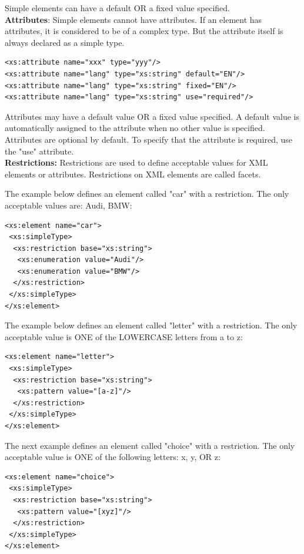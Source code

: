\documentclass[11pt,oneside,a4paper]{article}
\begin{document}
Simple elements can have a default OR a fixed value specified.\\

\textbf{Attributes}: Simple elements cannot have attributes. If an element has attributes, it is considered to be of a complex type. But the attribute itself is always declared as a simple type.

\lstset{language=XML}
\begin{lstlisting}
<xs:attribute name="xxx" type="yyy"/> 
<xs:attribute name="lang" type="xs:string" default="EN"/> 
<xs:attribute name="lang" type="xs:string" fixed="EN"/> 
<xs:attribute name="lang" type="xs:string" use="required"/> 
\end{lstlisting}
Attributes may have a default value OR a fixed value specified. A default value is automatically assigned to the attribute when no other value is specified. Attributes are optional by default. To specify that the attribute is required, use the "use" attribute.\\

\textbf{Restrictions:} Restrictions are used to define acceptable values for XML elements or attributes. Restrictions on XML elements are called facets.

The example below defines an element called "car" with a restriction. The only acceptable values are: Audi, BMW:
\lstset{language=XML}
\begin{lstlisting}
<xs:element name="car">
 <xs:simpleType>
  <xs:restriction base="xs:string">
   <xs:enumeration value="Audi"/>
   <xs:enumeration value="BMW"/>
  </xs:restriction>
 </xs:simpleType>
</xs:element>
\end{lstlisting}

The example below defines an element called "letter" with a restriction. The only acceptable value is ONE of the LOWERCASE letters from a to z:
\lstset{language=XML}
\begin{lstlisting}
<xs:element name="letter">
 <xs:simpleType>
  <xs:restriction base="xs:string">
   <xs:pattern value="[a-z]"/>
  </xs:restriction>
 </xs:simpleType>
</xs:element>
\end{lstlisting}

The next example defines an element called "choice" with a restriction. The only acceptable value is ONE of the following letters: x, y, OR z:
\lstset{language=XML}
\begin{lstlisting}
<xs:element name="choice">
 <xs:simpleType>
  <xs:restriction base="xs:string">
   <xs:pattern value="[xyz]"/>
  </xs:restriction>
 </xs:simpleType>
</xs:element> 
\end{lstlisting}
\end{document}
